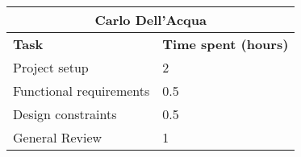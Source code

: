 \begin{table}[h]
  \center
  \begin{tabular}{l|l}
    \multicolumn{2}{c}{\textbf{Carlo Dell'Acqua}} \\
    \hline
    \textbf{Task} & \textbf{Time spent (hours)}\\
    \hline
    Project setup & 2 \\
    Functional requirements & 0.5 \\
    Design constraints & 0.5 \\
    General Review & 1
  \end{tabular}
\end{table}